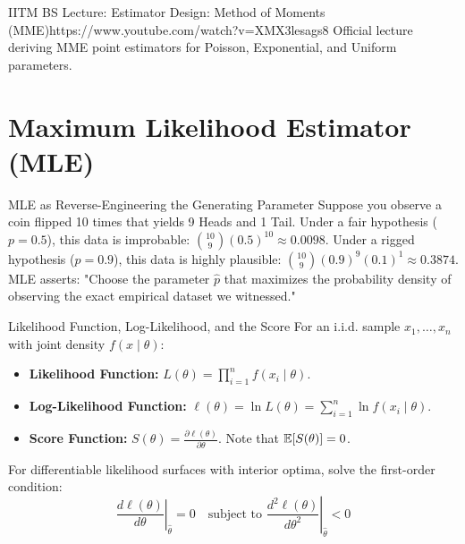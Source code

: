 \begin{videocard}{IITM BS Lecture: Estimator Design: Method of Moments (MME)}{https://www.youtube.com/watch?v=XMX3lesags8}
Official lecture deriving MME point estimators for Poisson, Exponential, and Uniform parameters.
\end{videocard}

\section{Maximum Likelihood Estimator (MLE)}

\begin{intuitionbox}{MLE as Reverse-Engineering the Generating Parameter}
Suppose you observe a coin flipped 10 times that yields 9 Heads and 1 Tail. Under a fair hypothesis ($p=0.5$), this data is improbable: $\binom{10}{9}(0.5)^{10} \approx 0.0098$. Under a rigged hypothesis ($p=0.9$), this data is highly plausible: $\binom{10}{9}(0.9)^9 (0.1)^1 \approx 0.3874$. MLE asserts: "Choose the parameter $\hat{p}$ that maximizes the probability density of observing the exact empirical dataset we witnessed."
\end{intuitionbox}

\begin{definitionbox}{Likelihood Function, Log-Likelihood, and the Score}
For an i.i.d. sample $x_1, \dots, x_n$ with joint density $f(x \mid \theta)$:
\begin{itemize}
    \item \textbf{Likelihood Function:} $L(\theta) = \prod_{i=1}^n f(x_i \mid \theta)$.
    \item \textbf{Log-Likelihood Function:} $\ell(\theta) = \ln L(\theta) = \sum_{i=1}^n \ln f(x_i \mid \theta)$.
    \item \textbf{Score Function:} $S(\theta) = \frac{\partial \ell(\theta)}{\partial \theta}$. Note that $\mathbb{E}[S(\theta)] = 0$.
\end{itemize}
For differentiable likelihood surfaces with interior optima, solve the first-order condition:
$$\left. \frac{d\ell(\theta)}{d\theta} \right|_{\hat{\theta}} = 0 \quad \text{subject to } \left. \frac{d^2\ell(\theta)}{d\theta^2} \right|_{\hat{\theta}} < 0$$
\end{definitionbox}

